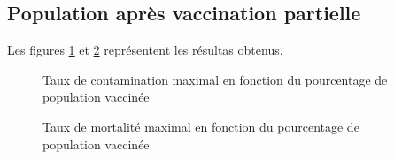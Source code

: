 \documentclass[12pt,a4paper,titlepage]{report}
\begin{document}
\subsection*{Population après vaccination partielle}
Les figures \ref{fig:2-2-nb-malades} 
et \ref{fig:2-2-nb-morts} représentent les résultas obtenus.
\begin{figure}[h]
  \centering
  \caption{Taux de contamination maximal en fonction du pourcentage de population vaccinée}
  \label{fig:2-2-nb-malades}
\end{figure}

 \begin{figure}[h]
  \centering
  \caption{Taux de mortalité maximal en fonction du pourcentage de population vaccinée}
  \label{fig:2-2-nb-morts}
\end{figure}
\end{document}
